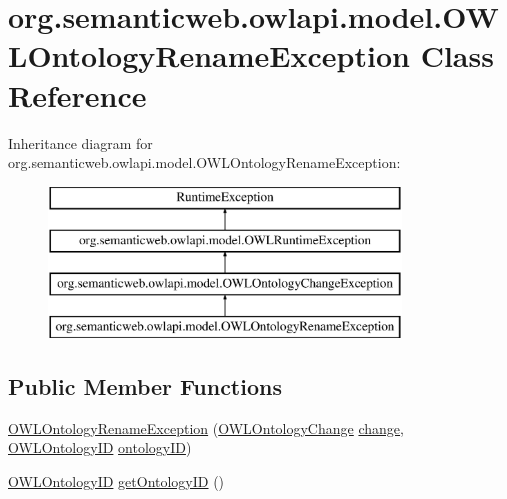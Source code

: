 \hypertarget{classorg_1_1semanticweb_1_1owlapi_1_1model_1_1_o_w_l_ontology_rename_exception}{\section{org.\-semanticweb.\-owlapi.\-model.\-O\-W\-L\-Ontology\-Rename\-Exception Class Reference}
\label{classorg_1_1semanticweb_1_1owlapi_1_1model_1_1_o_w_l_ontology_rename_exception}
}
Inheritance diagram for org.\-semanticweb.\-owlapi.\-model.\-O\-W\-L\-Ontology\-Rename\-Exception\-:\begin{figure}[H]
\begin{center}
\leavevmode
\includegraphics[height=4.000000cm]{classorg_1_1semanticweb_1_1owlapi_1_1model_1_1_o_w_l_ontology_rename_exception}
\end{center}
\end{figure}
\subsection*{Public Member Functions}
\begin{DoxyCompactItemize}
\item 
\hyperlink{classorg_1_1semanticweb_1_1owlapi_1_1model_1_1_o_w_l_ontology_rename_exception_aef078cfd900499e5c7ad005af970bed5}{O\-W\-L\-Ontology\-Rename\-Exception} (\hyperlink{classorg_1_1semanticweb_1_1owlapi_1_1model_1_1_o_w_l_ontology_change}{O\-W\-L\-Ontology\-Change} \hyperlink{classorg_1_1semanticweb_1_1owlapi_1_1model_1_1_o_w_l_ontology_change_exception_a9e4c14dc90fcc563956fb7207c67640a}{change}, \hyperlink{classorg_1_1semanticweb_1_1owlapi_1_1model_1_1_o_w_l_ontology_i_d}{O\-W\-L\-Ontology\-I\-D} \hyperlink{classorg_1_1semanticweb_1_1owlapi_1_1model_1_1_o_w_l_ontology_rename_exception_a0666e4a70846bee5270435f6c508cb9d}{ontology\-I\-D})
\item 
\hyperlink{classorg_1_1semanticweb_1_1owlapi_1_1model_1_1_o_w_l_ontology_i_d}{O\-W\-L\-Ontology\-I\-D} \hyperlink{classorg_1_1semanticweb_1_1owlapi_1_1model_1_1_o_w_l_ontology_rename_exception_afff1fa06b4d17199455c9ecb023452ae}{get\-Ontology\-I\-D} ()
\end{DoxyCompactItemize}
